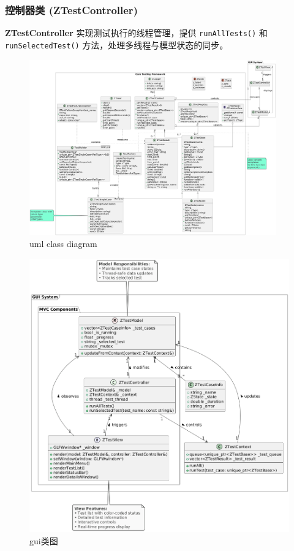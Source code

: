 \documentclass[chinese]{article}
\begin{document}
\subsubsection{控制器类 (\textbf{ZTestController})}
\textbf{ZTestController} 实现测试执行的线程管理，提供 \texttt{runAllTests()} 和 \texttt{runSelectedTest()} 方法，处理多线程与模型状态的同步。



\begin{figure}[H]
    \centering
    \includegraphics[angle=270,width=0.95\textwidth]{img/umlcore.png} %
    \caption{ uml class diagram}
    \label{fig:diagram}
\end{figure}
\begin{figure}[H]
    \centering
    \includegraphics[angle=270,width=\textwidth]{img/umlgui.png} %
    \caption{ gui类图}
    \label{fig:diagram}
\end{figure}
\newpage
\end{document}
